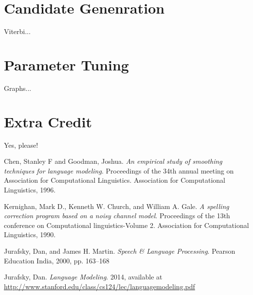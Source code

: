 \documentclass{article}
\begin{document}
\section{Candidate Genenration}

Viterbi...

\section{Parameter Tuning}

Graphs...

\section{Extra Credit}

Yes, please!

\begin{thebibliography}{9}

    Chen, Stanley F and Goodman, Joshua.
    \emph{An empirical study of smoothing techniques for language modeling}.
    Proceedings of the 34th annual meeting on Association for Computational Linguistics. Association for Computational Linguistics, 1996.

    Kernighan, Mark D., Kenneth W. Church, and William A. Gale.
    \emph{A spelling correction program based on a noisy channel model}.
    Proceedings of the 13th conference on Computational linguistics-Volume 2. Association for Computational Linguistics, 1990.

    Jurafsky, Dan, and James H. Martin.
    \emph{Speech \& Language Processing}.
    Pearson Education India, 2000, pp. 163--168

    Jurafsky, Dan.
    \emph{Language Modeling}.
    2014, available at \url{http://www.stanford.edu/class/cs124/lec/languagemodeling.pdf}
\end{thebibliography}
\end{document}
